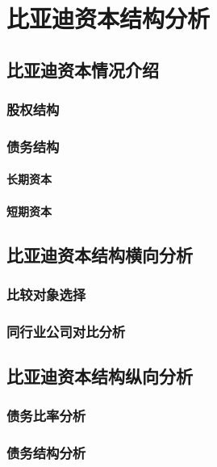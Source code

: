 \chapter{比亚迪资本结构分析}


\section{比亚迪资本情况介绍}


\subsection{股权结构}


\subsection{债务结构}


\subsubsection{长期资本}


\subsubsection{短期资本}


\section{比亚迪资本结构横向分析}


\subsection{比较对象选择}


\subsection{同行业公司对比分析}


\section{比亚迪资本结构纵向分析}


\subsection{债务比率分析}


\subsection{债务结构分析}


